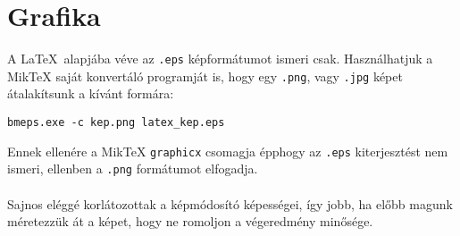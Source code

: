 \documentclass[a4paper]{report}             %
\begin{document}

\section{Grafika}

A \LaTeX\ alapjába véve az \verb".eps" képformátumot ismeri csak. Használhatjuk
a MikTeX saját konvertáló programját is, hogy egy \verb".png", vagy
\verb".jpg" képet átalakítsunk a kívánt formára:

\begin{verbatim}
bmeps.exe -c kep.png latex_kep.eps
\end{verbatim}

Ennek ellenére a MikTeX \verb"graphicx" csomagja épphogy az \verb".eps"
kiterjesztést nem ismeri, ellenben a \verb".png" formátumot elfogadja.\\
\\
Sajnos eléggé korlátozottak a képmódosító képességei, így jobb, ha előbb
magunk méretezzük át a képet, hogy ne romoljon a végeredmény minősége.\\
\\
\end{document}
